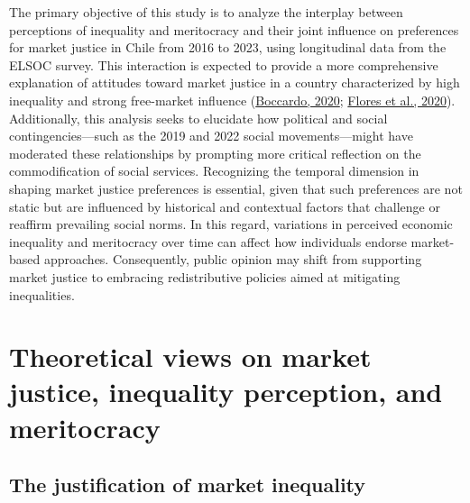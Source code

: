 \documentclass[
  12pt,
]{article}
\begin{document}
The primary objective of this study is to analyze the interplay between
perceptions of inequality and meritocracy and their joint influence on
preferences for market justice in Chile from 2016 to 2023, using
longitudinal data from the ELSOC survey. This interaction is expected to
provide a more comprehensive explanation of attitudes toward market
justice in a country characterized by high inequality and strong
free-market influence
(\protect\hyperlink{ref-boccardo_30_2020}{Boccardo, 2020};
\protect\hyperlink{ref-flores_top_2020}{Flores et al., 2020}).
Additionally, this analysis seeks to elucidate how political and social
contingencies---such as the 2019 and 2022 social movements---might have
moderated these relationships by prompting more critical reflection on
the commodification of social services. Recognizing the temporal
dimension in shaping market justice preferences is essential, given that
such preferences are not static but are influenced by historical and
contextual factors that challenge or reaffirm prevailing social norms.
In this regard, variations in perceived economic inequality and
meritocracy over time can affect how individuals endorse market-based
approaches. Consequently, public opinion may shift from supporting
market justice to embracing redistributive policies aimed at mitigating
inequalities.

\hypertarget{theoretical-views-on-market-justice-inequality-perception-and-meritocracy}{%
\section{Theoretical views on market justice, inequality perception, and
meritocracy}\label{theoretical-views-on-market-justice-inequality-perception-and-meritocracy}}

\hypertarget{the-justification-of-market-inequality}{%
\subsection{The justification of market
inequality}\label{the-justification-of-market-inequality}}
\end{document}
